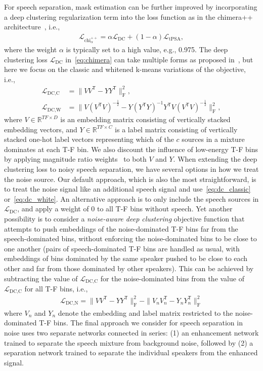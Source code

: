 \documentclass[a4paper]{article}
\def\T{{\mathsf T}}
\def\F{{\mathrm F}}
\begin{document}
For speech separation, mask estimation can be further improved by incorporating a deep clustering regularization term into the loss function as in the chimera++ architecture~\cite{Wang2018ICASSP04Alternative}, i.e.,
\begin{align} \label{eq:chimera}
	\mathcal{L}_{\text{chi}^{++}_\alpha}=\alpha \mathcal{L}_{\text{DC}}+(1-\alpha)\mathcal{L}_{\text{tPSA}},
\end{align}
where the weight $\alpha$ is typically set to a high value, e.g., 0.975.  The deep clustering loss $\mathcal{L}_{\text{DC}}$ in~\eqref{eq:chimera} can take multiple forms as proposed in~\cite{Wang2018ICASSP04Alternative}, but here we focus on the classic and whitened k-means variations of the objective, i.e., 
\begin{align}\label{eq:dc_classic}
\mathcal{L}_{\text{DC},\text{C}}&\!=\!\|V V^{\T}-YY^{\T}\|_{\F}^2,\\
\label{eq:dc_white}
    \mathcal{L}_{\text{DC},\text{W}}&\! =\!\|V(V^{\T}V)^{-\frac{1}{2}} \!-\!  Y(Y^{\T}Y)^{-1}Y^{\T} V (V^{\T}V)^{-\frac{1}{2}} \|_{\F}^2, \!
\end{align}
where $V\in \mathbb{R}^{TF\times D}$ is an embedding matrix consisting of vertically stacked embedding vectors, and $Y\in \mathbb{R}^{TF\times C}$ is a label matrix consisting of vertically stacked one-hot label vectors representing which of the $c$ sources in a mixture dominates at each T-F bin.  We also discount the influence of low-energy T-F bins by applying magnitude ratio weights~\cite{Wang2018ICASSP04Alternative} to both $V$ and $Y$.  When extending the deep clustering loss to noisy speech separation, we have several options in how we treat the noise source. Our default approach, which is also the most straightforward, is to treat the noise signal like an additional speech signal and use~\eqref{eq:dc_classic} or~\eqref{eq:dc_white}.  An alternative approach is to only include the speech sources in $\mathcal{L}_{\text{DC}}$, and apply a weight of 0 to all T-F bins without speech. Yet another possibility is to consider a \emph{noise-aware deep clustering} objective function that attempts to push embeddings of the noise-dominated T-F bins far from the speech-dominated bins, without enforcing the noise-dominated bins to be close to one another (pairs of speech-dominated T-F bins are handled as usual, with embeddings of bins dominated by the same speaker pushed to be close to each other and far from those dominated by other speakers).  This can be achieved by subtracting the value of $\mathcal{L}_{\text{DC},\text{C}}$ for the noise-dominated bins from the value of $\mathcal{L}_{\text{DC},\text{C}}$ for all T-F bins, i.e.,
\begin{align}\label{eq:dc_noisy}
\mathcal{L}_{\text{DC},\text{N}}=\|V V^{\T}-YY^{\T}\|_{\F}^2 - \|V_n V_n^{\T}-Y_nY_n^{\T}\|_{\F}^2
\end{align}
where $V_n$ and $Y_n$ denote the embedding and label matrix restricted to the noise-dominated T-F bins.  The final approach we consider for speech separation in noise uses two separate networks connected in series: (1) an enhancement network trained to separate the speech mixture from background noise, followed by (2) a separation network trained to separate the individual speakers from the enhanced signal.
\end{document}
